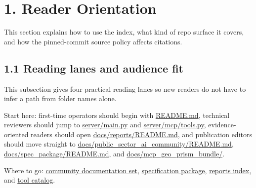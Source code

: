 \section{1. Reader Orientation}\label{reader-orientation}

This section explains how to use the index, what kind of repo surface it
covers, and how the pinned-commit source policy affects citations.

\subsection{1.1 Reading lanes and audience
fit}\label{reading-lanes-and-audience-fit}

This subsection gives four practical reading lanes so new readers do not
have to infer a path from folder names alone.

Start here: first-time operators should begin with
\href{https://github.com/chris-page-gov/mcp-geo/blob/fe862910da246ca77f374cfbe484985f5df4d316/README.md\#L1-L240}{README.md},
technical reviewers should jump to
\href{https://github.com/chris-page-gov/mcp-geo/blob/fe862910da246ca77f374cfbe484985f5df4d316/server/main.py\#L1-L216}{server/main.py}
and
\href{https://github.com/chris-page-gov/mcp-geo/blob/fe862910da246ca77f374cfbe484985f5df4d316/server/mcp/tools.py\#L1-L260}{server/mcp/tools.py},
evidence-oriented readers should open
\href{https://github.com/chris-page-gov/mcp-geo/blob/fe862910da246ca77f374cfbe484985f5df4d316/docs/reports/README.md\#L1-L71}{docs/reports/README.md},
and publication editors should move straight to
\href{https://github.com/chris-page-gov/mcp-geo/blob/fe862910da246ca77f374cfbe484985f5df4d316/docs/public_sector_ai_community/README.md\#L1-L60}{docs/public\_sector\_ai\_community/README.md},
\href{https://github.com/chris-page-gov/mcp-geo/blob/fe862910da246ca77f374cfbe484985f5df4d316/docs/spec_package/README.md\#L1-L45}{docs/spec\_package/README.md},
and
\href{https://github.com/chris-page-gov/mcp-geo/tree/fe862910da246ca77f374cfbe484985f5df4d316/docs/mcp_geo_prism_bundle}{docs/mcp\_geo\_prism\_bundle/}.

Where to go:
\href{https://github.com/chris-page-gov/mcp-geo/tree/fe862910da246ca77f374cfbe484985f5df4d316/docs/public_sector_ai_community}{community
documentation set},
\href{https://github.com/chris-page-gov/mcp-geo/tree/fe862910da246ca77f374cfbe484985f5df4d316/docs/spec_package}{specification
package},
\href{https://github.com/chris-page-gov/mcp-geo/blob/fe862910da246ca77f374cfbe484985f5df4d316/docs/reports/README.md}{reports
index}, and
\href{https://github.com/chris-page-gov/mcp-geo/blob/fe862910da246ca77f374cfbe484985f5df4d316/docs/tool_catalog.md\#L1-L61}{tool
catalog}.

